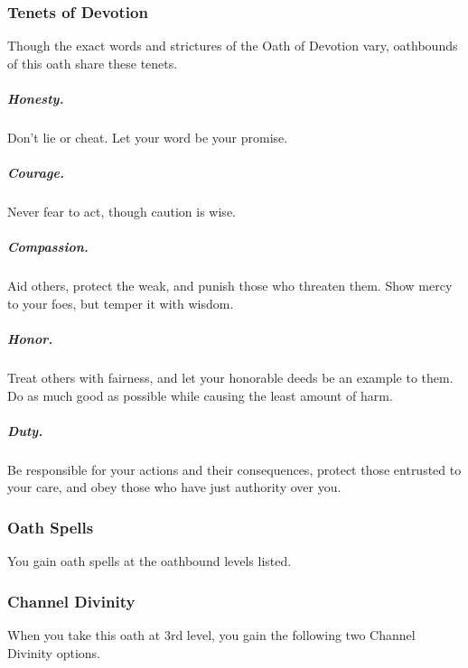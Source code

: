 \subsubsection{Tenets of Devotion}

Though the exact words and strictures of the Oath of Devotion vary, oathbounds of this oath share these tenets.

\subparagraph*{Honesty.} Don't lie or cheat. Let your word be your promise.

\subparagraph*{Courage.} Never fear to act, though caution is wise.

\subparagraph*{Compassion.} Aid others, protect the weak, and punish those who threaten them. Show mercy to your foes, but temper it with wisdom.

\subparagraph*{Honor.} Treat others with fairness, and let your honorable deeds be an example to them. Do as much good as possible while causing the least amount of harm.

\subparagraph*{Duty.} Be responsible for your actions and their consequences, protect those entrusted to your care, and obey those who have just authority over you.

\subsubsection{Oath Spells}

You gain oath spells at the oathbound levels listed.


\subsubsection{Channel Divinity}

When you take this oath at 3rd level, you gain the following two Channel Divinity options.

